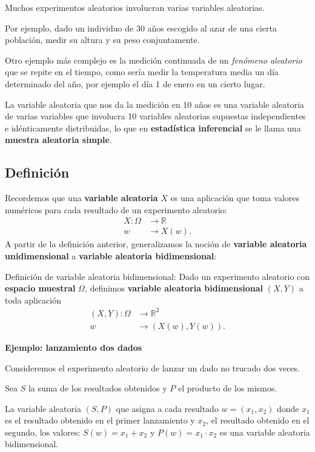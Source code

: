 \documentclass[
  letterpaper,
  DIV=11,
  numbers=noendperiod]{scrreprt}
\begin{document}
Muchos experimentos aleatorios involucran varias variables aleatorias.

Por ejemplo, dado un individuo de 30 años escogido al azar de una cierta
población, medir su altura y su peso conjuntamente.

Otro ejemplo más complejo es la medición continuada de un \emph{fenómeno
aleatorio} que se repite en el tiempo, como sería medir la temperatura
media un día determinado del año, por ejemplo el día 1 de enero en un
cierto lugar.

La variable aleatoria que nos da la medición en 10 años es una variable
aleatoria de varias variables que involucra 10 variables aleatorias
supuestas independientes e idénticamente distribuidas, lo que en
\textbf{estadística inferencial} se le llama una \textbf{muestra
aleatoria simple}.

\hypertarget{definiciuxf3n}{%
\subsection{Definición}\label{definiciuxf3n}}

Recordemos que una \textbf{variable aleatoria} \(X\) es una aplicación
que toma valores numéricos para cada resultado de un experimento
aleatorio: \[
\begin{array}{rl}
X: \Omega & \longrightarrow \mathbb{R}\\
w & \longrightarrow X(w).
\end{array}
\] A partir de la definición anterior, generalizamos la noción de
\textbf{variable aleatoria unidimensional} a \textbf{variable aleatoria
bidimensional}:

Definición de variable aleatoria bidimensional: Dado un experimento
aleatorio con \textbf{espacio muestral} \(\Omega\), definimos
\textbf{variable aleatoria bidimensional} \((X,Y)\) a toda aplicación \[
\begin{array}{rl}
(X,Y): \Omega & \longrightarrow \mathbb{R}^2\\
w & \longrightarrow (X(w),Y(w)).
\end{array}
\]

\textbf{Ejemplo: lanzamiento dos dados}

Consideremos el experimento aleatorio de lanzar un dado no trucado dos
veces.

Sea \(S\) la suma de los resultados obtenidos y \(P\) el producto de los
mismos.

La variable aleatoria \((S,P)\) que asigna a cada resultado
\(w=(x_1,x_2)\) donde \(x_1\) es el resultado obtenido en el primer
lanzamiento y \(x_2\), el resultado obtenido en el segundo, los valores:
\(S(w)=x_1+x_2\) y \(P(w)=x_1\cdot x_2\) es una variable aleatoria
bidimensional.
\end{document}
